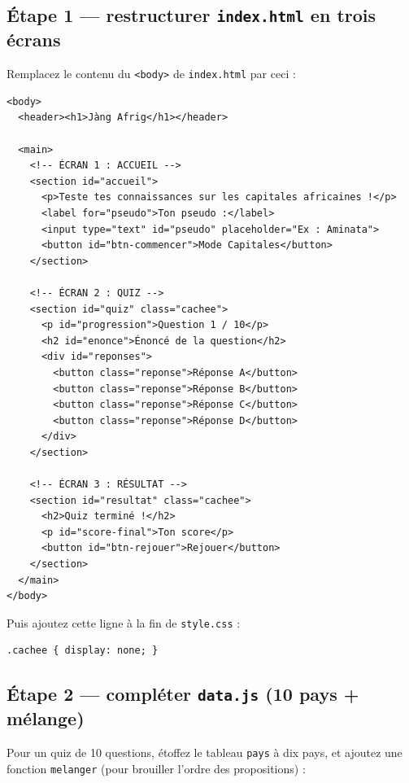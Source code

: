 \documentclass[11pt,a4paper]{article}
\newcommand{\code}[1]{\texttt{#1}}
\begin{document}
\subsection{Étape 1 --- restructurer \texttt{index.html} en trois écrans}

Remplacez le contenu du \code{<body>} de \code{index.html} par ceci :

\begin{lstlisting}[style=html]
<body>
  <header><h1>Jàng Afrig</h1></header>

  <main>
    <!-- ÉCRAN 1 : ACCUEIL -->
    <section id="accueil">
      <p>Teste tes connaissances sur les capitales africaines !</p>
      <label for="pseudo">Ton pseudo :</label>
      <input type="text" id="pseudo" placeholder="Ex : Aminata">
      <button id="btn-commencer">Mode Capitales</button>
    </section>

    <!-- ÉCRAN 2 : QUIZ -->
    <section id="quiz" class="cachee">
      <p id="progression">Question 1 / 10</p>
      <h2 id="enonce">Énoncé de la question</h2>
      <div id="reponses">
        <button class="reponse">Réponse A</button>
        <button class="reponse">Réponse B</button>
        <button class="reponse">Réponse C</button>
        <button class="reponse">Réponse D</button>
      </div>
    </section>

    <!-- ÉCRAN 3 : RÉSULTAT -->
    <section id="resultat" class="cachee">
      <h2>Quiz terminé !</h2>
      <p id="score-final">Ton score</p>
      <button id="btn-rejouer">Rejouer</button>
    </section>
  </main>
</body>
\end{lstlisting}

Puis ajoutez cette ligne à la fin de \code{style.css} :
\begin{lstlisting}[style=html]
.cachee { display: none; }
\end{lstlisting}

\subsection{Étape 2 --- compléter \texttt{data.js} (10 pays + mélange)}

Pour un quiz de 10 questions, étoffez le tableau \code{pays} à dix pays, et ajoutez une fonction \code{melanger} (pour brouiller l'ordre des propositions) :
\end{document}
